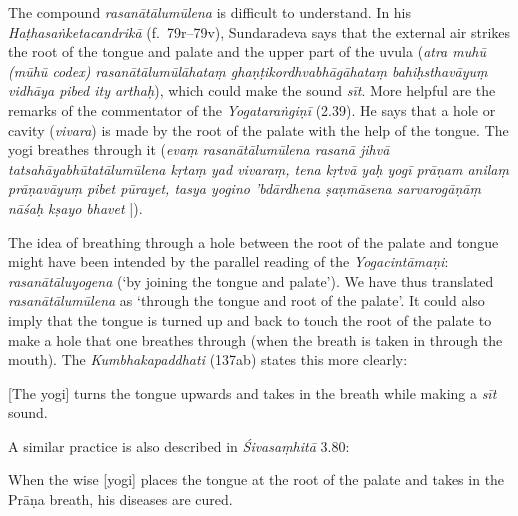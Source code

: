 \begin{ekdosis}
\begin{philcomm}[hp02_057]

The compound \emph{rasanātālumūlena} is difficult to understand. In his \emph{Haṭhasaṅketacandrikā} (f.~79r–79v), Sundaradeva says that the external air strikes the root of the tongue and palate and the upper part of the uvula (\emph{atra muhū (mūhū codex) rasanātālumūlāhataṃ ghaṇṭikordhvabhāgāhataṃ bahiḥsthavāyuṃ vidhāya pibed ity arthaḥ}), which could make the sound \emph{sīt}. More helpful are the remarks of the commentator of the \emph{Yogataraṅgiṇī} (2.39). He says that a hole or cavity (\emph{vivara}) is made by the root of the palate with the help of the tongue. The yogi breathes through it (\emph{evaṃ rasanātālumūlena rasanā jihvā tatsahāyabhūtatālumūlena kṛtaṃ yad vivaraṃ, tena kṛtvā yaḥ yogī prāṇam anilaṃ prāṇavāyuṃ pibet pūrayet, tasya yogino ’bdārdhena ṣaṇmāsena sarvarogāṇāṃ nāśaḥ kṣayo bhavet} |).

The idea of breathing through a hole between the root of the palate and tongue might have been intended by the parallel reading of the \emph{Yogacintāmaṇi}: \emph{rasanā\-tālu\-yogena} (‘by joining the tongue and palate'). We have thus translated \emph{rasanā\-tālu\-mūlena} as ‘through the tongue and root of the palate’. It could also imply that the tongue is turned up and back to touch the root of the palate to make a hole that one breathes through (when the breath is taken in through the mouth). The \emph{Kumbhaka\-paddhati} (137ab) states this more clearly:

\begin{versinnote}
{}[The yogi] turns the tongue upwards and takes in the breath while making a \emph{sīt} sound.\\ 
\end{versinnote}

A similar practice is also described in \emph{Śivasaṃhitā} 3.80:

\begin{versinnote}
When the wise [yogi] places the tongue at the root of the palate and takes in the Prāṇa breath, his diseases are cured.
\end{versinnote}
\begin{versinnote}
\end{versinnote}


\end{philcomm}
\end{ekdosis}
